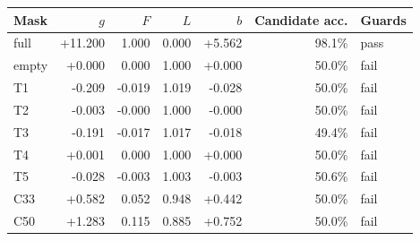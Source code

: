 \begin{tabular}{@{}lrrrrrl@{}}
\toprule
Mask & $g$ & $F$ & $L$ & $b$ & Candidate acc. & Guards \\
\midrule
full & +11.200 & 1.000 & 0.000 & +5.562 & 98.1\% & pass \\
empty & +0.000 & 0.000 & 1.000 & +0.000 & 50.0\% & fail \\
T1 & -0.209 & -0.019 & 1.019 & -0.028 & 50.0\% & fail \\
T2 & -0.003 & -0.000 & 1.000 & -0.000 & 50.0\% & fail \\
T3 & -0.191 & -0.017 & 1.017 & -0.018 & 49.4\% & fail \\
T4 & +0.001 & 0.000 & 1.000 & +0.000 & 50.0\% & fail \\
T5 & -0.028 & -0.003 & 1.003 & -0.003 & 50.6\% & fail \\
C33 & +0.582 & 0.052 & 0.948 & +0.442 & 50.0\% & fail \\
C50 & +1.283 & 0.115 & 0.885 & +0.752 & 50.0\% & fail \\
\bottomrule
\end{tabular}
